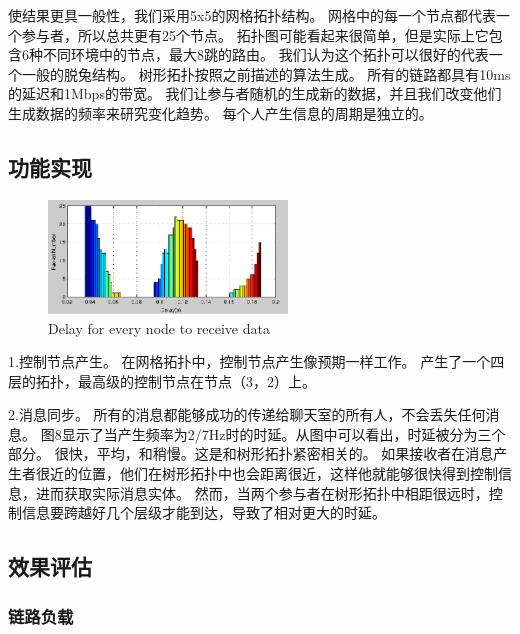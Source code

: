 \documentclass[a4paper]{article}
\begin{document}
使结果更具一般性，我们采用5x5的网格拓扑结构。
网格中的每一个节点都代表一个参与者，所以总共更有25个节点。
拓扑图可能看起来很简单，但是实际上它包含6种不同环境中的节点，最大8跳的路由。
我们认为这个拓扑可以很好的代表一个一般的脱兔结构。
树形拓扑按照之前描述的算法生成。
所有的链路都具有10ms的延迟和1Mbps的带宽。
我们让参与者随机的生成新的数据，并且我们改变他们生成数据的频率来研究变化趋势。
每个人产生信息的周期是独立的。

\subsection{功能实现}

\begin{figure}[!t]
\centering
\includegraphics[width=2.5in]{../png/function-delay.png}
\caption{Delay for every node to receive data}
\label{function_delay}
\end{figure}

1.控制节点产生。
在网格拓扑中，控制节点产生像预期一样工作。
产生了一个四层的拓扑，最高级的控制节点在节点（3，2）上。

2.消息同步。
所有的消息都能够成功的传递给聊天室的所有人，不会丢失任何消息。
图8显示了当产生频率为2/7Hz时的时延。从图中可以看出，时延被分为三个部分。
很快，平均，和稍慢。这是和树形拓扑紧密相关的。
如果接收者在消息产生者很近的位置，他们在树形拓扑中也会距离很近，这样他就能够很快得到控制信息，进而获取实际消息实体。
然而，当两个参与者在树形拓扑中相距很远时，控制信息要跨越好几个层级才能到达，导致了相对更大的时延。


\subsection{效果评估}

\subsubsection{链路负载}
\end{document}
